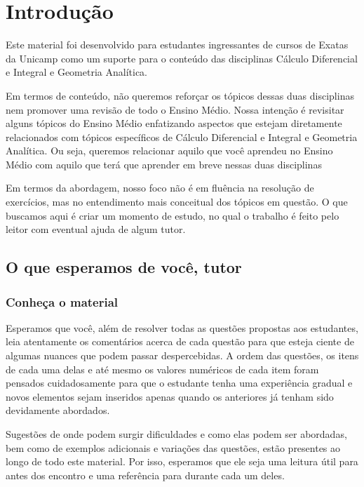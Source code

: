 

\chapter{Introdução}

\paraTutores

Este material foi desenvolvido para estudantes ingressantes de cursos de Exatas da Unicamp como um suporte para o conteúdo das disciplinas Cálculo Diferencial e Integral e Geometria Analítica.

Em termos de conteúdo, não queremos reforçar os tópicos dessas duas disciplinas nem promover uma revisão de todo o Ensino Médio. Nossa intenção é revisitar alguns tópicos do Ensino Médio enfatizando aspectos que estejam diretamente relacionados com tópicos específicos de Cálculo Diferencial e Integral e Geometria Analítica. Ou seja, queremos relacionar aquilo que você aprendeu no Ensino Médio com aquilo que terá que aprender em breve nessas duas disciplinas

Em termos da abordagem, nosso foco não é em fluência na resolução de exercícios, mas no entendimento mais conceitual dos tópicos em questão. O que buscamos aqui é criar um  momento de estudo, no qual o trabalho é feito pelo leitor com eventual ajuda de algum tutor.

\section{O que esperamos de você, tutor}

\subsection{Conheça o material}

Esperamos que você, além de resolver todas as questões propostas aos estudantes, leia atentamente os comentários acerca de cada questão para que esteja ciente de algumas nuances que podem passar despercebidas. A ordem das questões, os itens de cada uma delas e até mesmo os valores numéricos de cada item foram pensados cuidadosamente para que o estudante tenha uma experiência gradual e novos elementos sejam inseridos apenas quando os anteriores já tenham sido devidamente abordados.

Sugestões de onde podem surgir dificuldades e como elas podem ser abordadas, bem como de exemplos adicionais e variações das questões, estão presentes ao longo de todo este material. Por isso, esperamos que ele seja uma leitura útil para antes dos encontro e uma referência para durante cada um deles.

